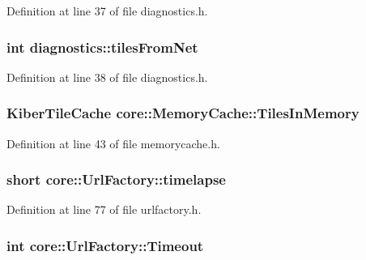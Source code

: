 \-Definition at line 37 of file diagnostics.\-h.

\hypertarget{group___o_p_map_widget_ga6750459fc54ae81a5870b841aff67c6c}{
\subsubsection[{tiles\-From\-Net}]{\setlength{\rightskip}{0pt plus 5cm}int {\bf diagnostics\-::tiles\-From\-Net}}}\label{group___o_p_map_widget_ga6750459fc54ae81a5870b841aff67c6c}


\-Definition at line 38 of file diagnostics.\-h.

\hypertarget{group___o_p_map_widget_gaeb53ae92c08d2646f4ecbcf764e7e226}{
\subsubsection[{\-Tiles\-In\-Memory}]{\setlength{\rightskip}{0pt plus 5cm}\-Kiber\-Tile\-Cache {\bf core\-::\-Memory\-Cache\-::\-Tiles\-In\-Memory}}}\label{group___o_p_map_widget_gaeb53ae92c08d2646f4ecbcf764e7e226}


\-Definition at line 43 of file memorycache.\-h.

\hypertarget{group___o_p_map_widget_ga5dba09925e03ae10c70290f9a2e9cc61}{
\subsubsection[{timelapse}]{\setlength{\rightskip}{0pt plus 5cm}short {\bf core\-::\-Url\-Factory\-::timelapse}}}\label{group___o_p_map_widget_ga5dba09925e03ae10c70290f9a2e9cc61}


\-Definition at line 77 of file urlfactory.\-h.

\hypertarget{group___o_p_map_widget_gaee21c04663fde2b41c6d471456dc7325}{
\subsubsection[{\-Timeout}]{\setlength{\rightskip}{0pt plus 5cm}int {\bf core\-::\-Url\-Factory\-::\-Timeout}}}\label{group___o_p_map_widget_gaee21c04663fde2b41c6d471456dc7325}


